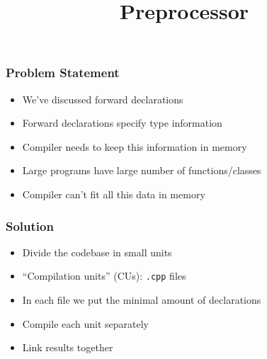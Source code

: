 
\usetikzlibrary{shadows,shapes.multipart}

\title{Preprocessor}






\begin{frame}
  \titlepage
\end{frame}

\begin{frame}
  \frametitle{Problem Statement}
  \begin{itemize}
    \item We've discussed forward declarations
    \item Forward declarations specify type information
    \item Compiler needs to keep this information in memory
    \item Large programs have large number of functions/classes
    \item Compiler can't fit all this data in memory
  \end{itemize}
\end{frame}

\begin{frame}
  \frametitle{Solution}
  \begin{center}
  \end{center}
  \begin{itemize}
    \item Divide the codebase in small units
    \item ``Compilation units'' (CUs): {\tt .cpp} files
    \item In each file we put the minimal amount of declarations
    \item Compile each unit separately
    \item Link results together
  \end{itemize}
\end{frame}

